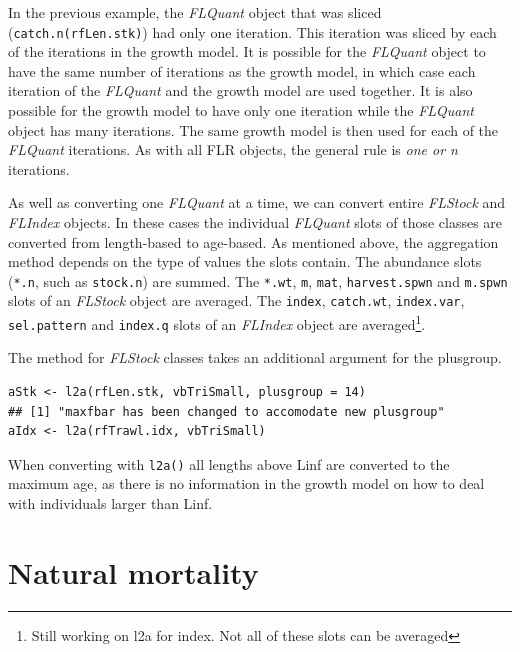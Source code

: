 \documentclass[a4paper,english,10pt]{article}\usepackage[]{graphicx}\usepackage[]{color}
\makeatletter
\newenvironment{kframe}{%
 \def\at@end@of@kframe{}%
 \ifinner\ifhmode%
  \def\at@end@of@kframe{\end{minipage}}%
  \begin{minipage}{\columnwidth}%
 \fi\fi%
 \def\FrameCommand##1{\hskip\@totalleftmargin \hskip-\fboxsep
 \colorbox{shadecolor}{##1}\hskip-\fboxsep
     \hskip-\linewidth \hskip-\@totalleftmargin \hskip\columnwidth}%
 \MakeFramed {\advance\hsize-\width
   \@totalleftmargin\z@ \linewidth\hsize
   \@setminipage}}%
 {\par\unskip\endMakeFramed%
 \at@end@of@kframe}
\newenvironment{knitrout}{}{} %
\newcommand{\code}[1]{{\texttt{#1}}}
\newcommand{\class}[1]{{\textit{#1}}}
\makeatother
\begin{document}
In the previous example, the \class{FLQuant} object that was sliced (\code{catch.n(rfLen.stk)}) had only one iteration. This iteration was sliced by each of the iterations in the growth model. It is possible for the \class{FLQuant} object to have the same number of iterations as the growth model, in which case each iteration of the \class{FLQuant} and the growth model are used together. It is also possible for the growth model to have only one iteration while the \class{FLQuant} object has many iterations. The same growth model is then used for each of the \class{FLQuant} iterations. As with all FLR objects, the general rule is \emph{one or n} iterations.


As well as converting one \class{FLQuant} at a time, we can convert entire \class{FLStock} and \class{FLIndex} objects. In these cases the individual \class{FLQuant} slots of those classes are converted from length-based to age-based. As mentioned above, the aggregation method depends on the type of values the slots contain. The abundance slots (\code{*.n}, such as \code{stock.n}) are summed. The \code{*.wt}, \code{m}, \code{mat}, \code{harvest.spwn} and \code{m.spwn} slots of an \class{FLStock} object are averaged. The \code{index}, \code{catch.wt}, \code{index.var}, \code{sel.pattern} and \code{index.q} slots of an \class{FLIndex} object are averaged\footnote{Still working on l2a for index. Not all of these slots can be averaged}.

The method for \class{FLStock} classes takes an additional argument for the plusgroup.

\begin{knitrout}
\color{fgcolor}\begin{kframe}
\begin{verbatim}
aStk <- l2a(rfLen.stk, vbTriSmall, plusgroup = 14)
## [1] "maxfbar has been changed to accomodate new plusgroup"
aIdx <- l2a(rfTrawl.idx, vbTriSmall)
\end{verbatim}
\end{kframe}
\end{knitrout}


When converting with \code{l2a()} all lengths above Linf are converted to the maximum age, as there is no information in the growth model on how to deal with individuals larger than Linf. 

\pagebreak
\section{Natural mortality}
\end{document}

